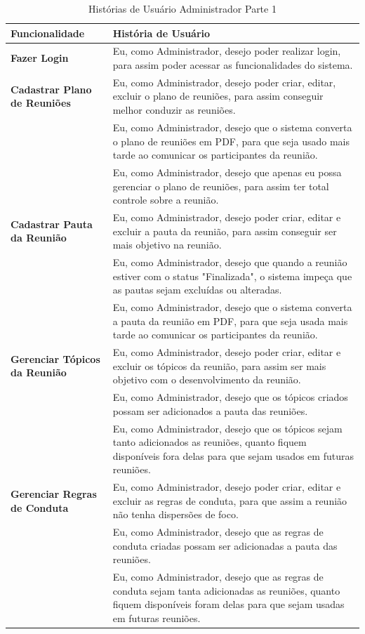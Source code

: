\begin{table}[H]
	\begin{tabular}{|p{4.0cm}|p{11.0cm}|} 
	\hline
	\textbf{Funcionalidade} & \textbf{História de Usuário} \\ \hline
	\textbf{Fazer Login} & Eu, como Administrador, desejo poder realizar login, para assim poder acessar as funcionalidades do sistema.  \\ \hline
	\textbf{Cadastrar Plano de Reuniões} & Eu, como Administrador, desejo poder criar, editar, excluir o plano de reuniões, para assim conseguir melhor conduzir as reuniões.\\ \hline
	& Eu, como Administrador, desejo que o sistema converta o plano de reuniões em PDF, para que seja usado mais tarde ao comunicar os participantes da reunião. \\ \hline
	& Eu, como Administrador, desejo que apenas eu possa gerenciar o plano de reuniões, para assim ter total controle sobre a reunião. \\ \hline
	\textbf{Cadastrar Pauta da Reunião} & Eu, como Administrador, desejo poder criar, editar e excluir a pauta da reunião, para assim conseguir ser mais objetivo na reunião. \\ \hline
	& Eu, como Administrador, desejo que quando a reunião estiver com o status "Finalizada", o sistema impeça que as pautas sejam excluídas ou alteradas. \\ \hline
	& Eu, como Administrador, desejo que o sistema converta a pauta da reunião em PDF, para que seja usada mais tarde ao comunicar os participantes da reunião. \\ \hline
	\textbf{Gerenciar Tópicos da Reunião} & Eu, como Administrador, desejo poder criar, editar e excluir os tópicos da reunião, para assim ser mais objetivo com o desenvolvimento da reunião. 
	\\ \hline
	& Eu, como Administrador, desejo que os tópicos criados possam ser adicionados a pauta das reuniões. \\ \hline
	& Eu, como Administrador, desejo que os tópicos sejam tanto adicionados as reuniões, quanto fiquem disponíveis fora delas para que sejam usados em futuras reuniões. \\ \hline
	\textbf{Gerenciar Regras de Conduta} & Eu, como Administrador, desejo poder criar, editar e excluir as regras de conduta, para que assim a reunião não tenha dispersões de foco. \\ \hline
	& Eu, como Administrador, desejo que as regras de conduta criadas possam ser adicionadas a pauta das reuniões. \\ \hline
	& Eu, como Administrador, desejo que as regras de conduta sejam tanta adicionadas as reuniões, quanto fiquem disponíveis foram delas para que sejam usadas em futuras reuniões. \\ \hline
	\end{tabular}
	 \caption{Histórias de Usuário Administrador Parte 1}
	 \label{tab:historias_de_usuario_administrador_parte1}
\end{table}

